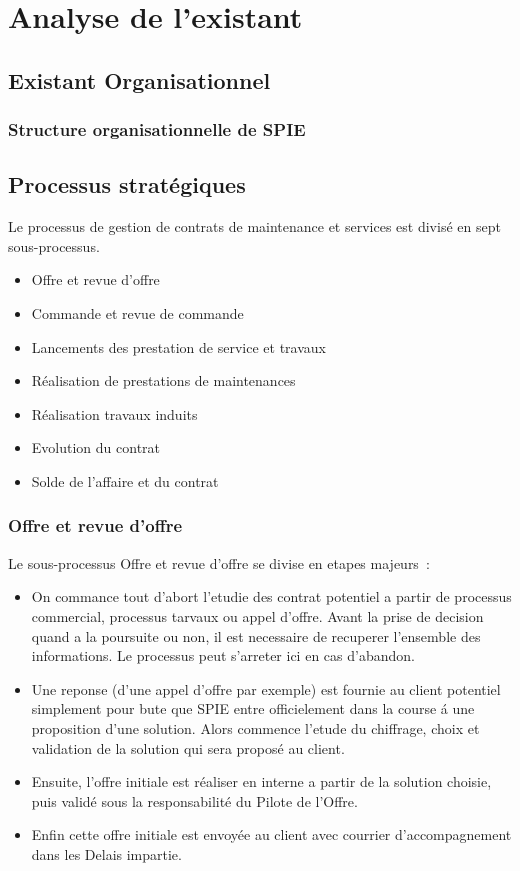 \chapter{Analyse de l’existant}

\section{Existant Organisationnel}
\subsection{Structure organisationnelle de SPIE}

\section{Processus stratégiques}

Le processus de gestion de contrats de maintenance et services est divis\'e en sept sous-processus.

\begin{itemize}
    \item Offre et revue d'offre
    \item Commande et revue de commande
    \item Lancements des prestation de service et travaux
    \item R\'ealisation de prestations de maintenances
    \item R\'ealisation travaux induits
    \item Evolution du contrat
    \item Solde de l'affaire et du contrat
\end{itemize}

\subsection{Offre et revue d'offre}

Le sous-processus Offre et revue d'offre se divise en etapes majeurs~:

\begin{itemize}
    \item On commance tout d'abort l'etudie des contrat potentiel a partir de processus commercial,
    processus tarvaux ou appel d'offre. Avant la prise de decision quand a la poursuite ou non,
    il est necessaire de recuperer l'ensemble des informations. Le processus peut s'arreter ici
    en cas d'abandon.
    \item Une reponse (d'une appel d'offre par exemple) est fournie au client potentiel simplement
    pour bute que SPIE entre officielement dans la course \'a une proposition d'une solution. Alors
    commence l'etude du chiffrage, choix et validation de la solution qui sera propos\'e au client.
    \item Ensuite, l'offre initiale est r\'ealiser en interne a partir de la solution choisie, puis
    valid\'e sous la responsabilit\'e du Pilote de l'Offre.
    \item Enfin cette offre initiale est envoy\'ee au client avec courrier d'accompagnement dans les
    Delais impartie.
\end{itemize}

